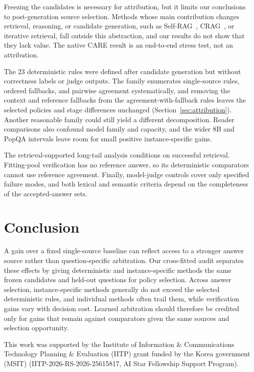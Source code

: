 \documentclass[sigconf]{acmart}
\begin{document}
Freezing the candidates is necessary for attribution, but it limits our
conclusions to post-generation source selection. Methods whose main
contribution changes retrieval, reasoning, or candidate generation,
such as Self-RAG~\cite{asai2024selfrag}, CRAG~\cite{yan2024crag}, or
iterative retrieval, fall outside this abstraction, and our results do
not show that they lack value. The native CARE result is an end-to-end
stress test, not an attribution.

The $23$ deterministic rules were defined after candidate generation
but without correctness labels or judge outputs. The family enumerates
single-source rules, ordered fallbacks, and pairwise agreement
systematically, and removing the context and reference fallbacks from
the agreement-with-fallback rules leaves the selected policies and
stage differences unchanged (Section~\ref{sec:attribution}). Another
reasonable family could still yield a different decomposition. Reader
comparisons also
confound model family and capacity, and the wider 8B and PopQA
intervals leave room for small positive instance-specific gains.

The retrieval-supported long-tail analysis conditions on successful
retrieval. Fitting-pool verification has no reference answer, so its
deterministic comparators cannot use reference agreement. Finally,
model-judge controls cover only specified failure modes, and both
lexical and semantic criteria depend on the completeness of the
accepted-answer sets.

\section{Conclusion}
\label{sec:conclusion}

A gain over a fixed single-source baseline can reflect access to a
stronger answer source rather than question-specific arbitration. Our
cross-fitted audit separates these effects by giving deterministic and
instance-specific methods the same frozen candidates and held-out
questions for policy selection. Across answer selection,
instance-specific methods generally do not exceed the selected
deterministic rules, and individual methods often trail them, while
verification gains vary with decision cost.
Learned arbitration should therefore be credited only for gains that
remain against comparators given the same sources and selection
opportunity.

\begin{acks}
This work was supported by the Institute of Information \& Communications
Technology Planning \& Evaluation (IITP) grant funded by the Korea
government (MSIT) (IITP-2026-RS-2026-25615817, AI Star Fellowship Support
Program).
\end{acks}
\end{document}

